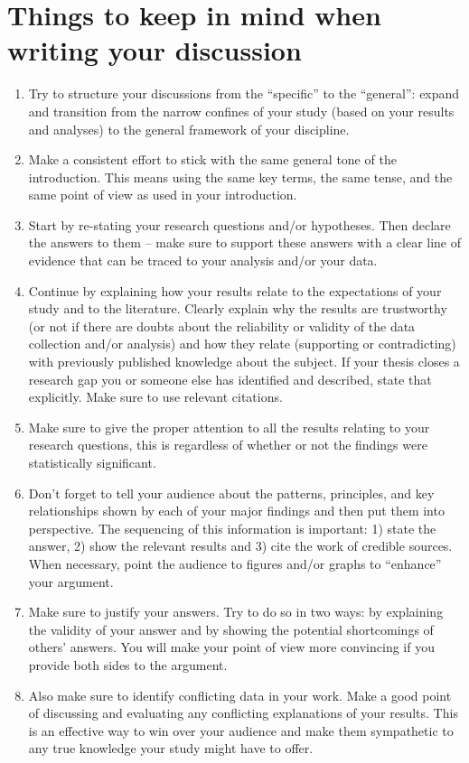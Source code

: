 \section{Things to keep in mind when writing your discussion}
\begin{enumerate}
    \item Try to structure your discussions from the ``specific'' to the ``general'': expand and transition from the narrow confines of your study (based on your results and analyses) to the general framework of your discipline.
    \item Make a consistent effort to stick with the same general tone of the introduction. This means using the same key terms, the same tense, and the same point of view as used in your introduction.
    \item Start by re-stating your research questions and/or hypotheses. Then declare the answers to them -- make sure to support these answers with a clear line of evidence that can be traced to your analysis and/or your data.
    \item Continue by explaining how your results relate to the expectations of your study and to the literature. Clearly explain why the results are trustworthy (or not if there are doubts about the reliability or validity of the data collection and/or analysis) and how they relate (supporting or contradicting) with previously published knowledge about the subject. If your thesis closes a research gap you or someone else has identified and described, state that explicitly. Make sure to use relevant citations.
    \item Make sure to give the proper attention to all the results relating to your research questions, this is regardless of whether or not the findings were statistically significant.
    \item Don't forget to tell your audience about the patterns, principles, and key relationships shown by each of your major findings and then put them into perspective. The sequencing of this information is important: 1) state the answer, 2) show the relevant results and 3) cite the work of credible sources. When necessary, point the audience to figures and/or graphs to ``enhance'' your argument.
    \item Make sure to justify your answers. Try to do so in two ways: by explaining the validity of your answer and by showing the potential shortcomings of others' answers. You will make your point of view more convincing if you provide both sides to the argument.
    \item Also make sure to identify conflicting data in your work. Make a good point of discussing and evaluating any conflicting explanations of your results. This is an effective way to win over your audience and make them sympathetic to any true knowledge your study might have to offer.

\end{enumerate}
